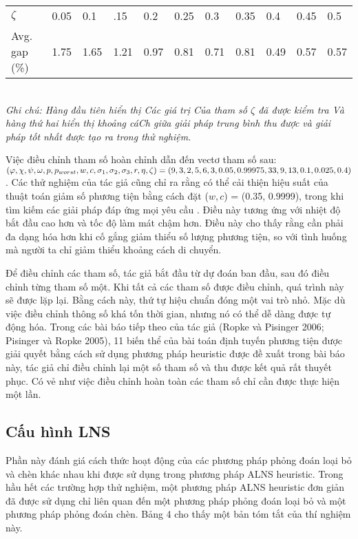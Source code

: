 \begin{table}[caption={Parameter $\zeta$ vs. Solution Quality}, label=tab:2]
    \begin{tabular}{@{}lllllllllll@{}}
        \hline
        $\zeta$ & 0.05 & 0.1  & .15  & 0.2  & 0.25 & 0.3  & 0.35 & 0.4  & 0.45 & 0.5     \\
        Avg. gap (\%) & 1.75 & 1.65 & 1.21 & 0.97 & 0.81 & 0.71 & 0.81 & 0.49 & 0.57 & 0.57     \\ \bottomrule
        \end{tabular} \\
        \justify
        \textit{Ghi chú: Hàng đầu tiên hiển thị Các giá trị Của tham số $\zeta$ đã được kiểm tra Và hàng thứ hai hiển thị khoảng cáCh giữa giải pháp trung bình thu được và giải pháp tốt nhất được tạo ra trong thử nghiệm.}
\end{table}

Việc điều chỉnh tham số hoàn chỉnh dẫn đến vectơ tham số sau:
$(\varphi, \chi, \psi, \omega, p,  p_{worst}, \\ w, c, \sigma_1, \sigma_2, \sigma_3, r, \eta, \zeta) = (9, 3, 2, 5, 6, 3, 0.05, 0.99975, 33, 9, 13, 0.1, 0.025, 0.4)$. Các thử nghiệm của tác giả cũng chỉ ra rằng có thể cải thiện hiệu suất của thuật toán giảm số phương tiện bằng cách đặt ($w,c$)  = (0.35, 0.9999), trong khi tìm kiếm các giải pháp đáp ứng mọi yêu cầu . Điều này tương ứng với nhiệt độ bắt đầu cao hơn và tốc độ làm mát chậm hơn. Điều này cho thấy rằng cần phải đa dạng hóa hơn khi cố gắng giảm thiểu số lượng phương tiện, so với tình huống mà người ta chỉ giảm thiểu khoảng cách di chuyển.

Để điều chỉnh các tham số, tác giả bắt đầu từ dự đoán ban đầu, sau đó điều chỉnh từng tham số một. Khi tất cả các tham số được điều chỉnh, quá trình này sẽ được lặp lại. Bằng cách này, thứ tự hiệu chuẩn đóng một vai trò nhỏ. Mặc dù việc điều chỉnh thông số khá tốn thời gian, nhưng nó có thể dễ dàng được tự động hóa. Trong các bài báo tiếp theo của tác giả (Ropke và Pisinger 2006; Pisinger và Ropke 2005), 11 biến thể của bài toán định tuyến phương tiện được giải quyết bằng cách sử dụng phương pháp heuristic được đề xuất trong bài báo này, tác giả chỉ điều chỉnh lại một số tham số và thu được kết quả rất thuyết phục. Có vẻ như việc điều chỉnh hoàn toàn các tham số chỉ cần được thực hiện một lần.

\subsection{Cấu hình LNS}
Phần này đánh giá cách thức hoạt động của các phương pháp phỏng đoán loại bỏ và chèn khác nhau khi được sử dụng trong phương pháp ALNS heuristic. Trong hầu hết các trường hợp thử nghiệm, một phương pháp ALNS heuristic đơn giản đã được sử dụng chỉ liên quan đến một phương pháp phỏng đoán loại bỏ và một phương pháp phỏng đoán chèn. Bảng 4 cho thấy một bản tóm tắt của thí nghiệm này.


